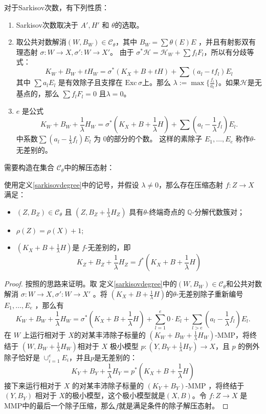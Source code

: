 \begin{remark}
  对于Sarkisov次数，有下列性质：
  \begin{enumerate}
    \item  Sarkisov次数取决于  $A', H'$ 和  $\theta$的选取。
    \item   取公共对数解消$ (W,B_W)\in \mathcal{C}_{\theta} $，其中 $ B_W=\sum \theta(E)E $ ，并且有射影双有理态射 $ \sigma:W\to X , \sigma':W\to X' $。 由于 $\sigma^*\mathcal{H}=\mathcal{H}_W+\sum f_{l}F_{l}$，所以有分歧等式：
          \[ K_W+B_W+tH_W=\sigma^*(K_X+B+tH)+\sum(a_l-tf_l)E_l \]
          其中 $ \sum a_l E_l $ 是有效除子且支撑在 $ \mathrm{Exc}\,\sigma $上。那么 $\lambda:=\max\{ \frac{f_l}{a_l}\}$。如果$ \mathcal{H} $是无基点的，那么 $ \sum f_lF_l=0 $ 且$\lambda=0  $。
    \item   $ e $ 是公式
          \[ K_W+B_W+\frac{1}{\lambda} H_W=\sigma^*(K_X+B+\frac{1}{\lambda} H)+\sum(a_l-\frac{1}{\lambda} f_l)E_l .\]
      中系数$\sum(a_l-\frac{1}{\lambda}f_l)E_l$ 为 $ 0 $的部分的个数。
          这样的素除子 $E_{1},\ldots, E_{e}$ 称作$\theta$-无差别的。
  \end{enumerate}
\end{remark}
需要构造在集合 $\mathcal{C}_{\theta}$中的解压态射：
\begin{lemma}\label{thetaextraction}
  使用定义\ref{sarkisovdegree}中的记号，并假设 $\lambda \neq 0$，那么存在压缩态射  $f: Z\to X$ 满足：
  \begin{itemize}
    \item $(Z,B_{Z})\in \mathcal{C}_{\theta}$ 且 $(Z,B_{Z}+\frac{1}{\lambda}H_{Z})$ 具有$\theta$-终端奇点的 $\mathbb{Q}$-分解代数簇对；
    \item  $\rho(Z)=\rho(X)+1$;
    \item $(K_{X}+B+\frac{1}{\lambda}H)$是 $f$-无差别的，即
          \[ K_{Z}+B_{Z}+\frac{1}{\lambda}H_{Z}=f^*(K_{X}+B+\frac{1}{\lambda}H) \]
  \end{itemize}
\end{lemma}
\begin{proof}
  按照\cite[Proposition 1.6]{brunoLogSarkisovProgram1995}的思路来证明。取 定义\ref{sarkisovdegree}中的$ (W,B_{W})\in \mathcal{C}_{\theta}$和公共对数解消  $\sigma:W\to X,\sigma':W \to X'$ 。将 $(K_{X}+B+\frac{1}{\lambda}H)$的$\theta$-无差别除子重新编号 $E_{1},\ldots ,E_{e}$ ，那么有
  \[ K_W+B_W+\frac{1}{\lambda} H_W=\sigma^*(K_X+B+\frac{1}{\lambda} H)+\sum_{l=1}^{e} 0\cdot E_{l}+\sum_{l>e}(a_l-\frac{1}{\lambda} f_l)E_l .\]
  在 $W$ 上运行相对于 $X$的对某丰沛除子标量的  $(K_{W}+B_{W}+\frac{1}{\lambda}H_{W})$-MMP，将终结于 $(W, B_{W}+\frac{1}{\lambda}H_{W})$相对于 $X$ 极小模型 $p:(Y, B_{Y}+\frac{1}{\lambda}H_{Y})\to X$，且 $p$ 的例外除子恰好是 $\cup_{i=1}^{e}E_{i}$，并且$p$是无差别的：
  \[
    K_{Y}+B_{Y}+\frac{1}{\lambda}H_{Y}=p^*(K_{X}+B+\frac{1}{\lambda}H)
    \]
  接下来运行相对于 $X$ 的对某丰沛除子标量的  $(K_{Y}+B_{Y})$-MMP ，将终结于  $(Y,B_{Y})$ 相对于 $X$的极小模型，这个极小模型就是$(X,B)$。令 $f: Z\to X$ 是MMP中的最后一个除子压缩，那么$f$就是满足条件的除子解压态射。
\end{proof}

